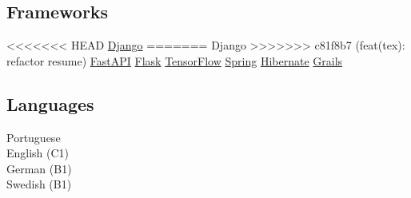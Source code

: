 \documentclass[]{willianpaixao-resume}
\begin{document}
\begin{minipage}[t]{0.34\textwidth}
\subsection{Frameworks}
<<<<<<< HEAD
\href{https://www.djangoproject.com/}{Django}\textbullet{}
=======
Django\textbullet{}
>>>>>>> c81f8b7 (feat(tex): refactor resume)
\href{https://fastapi.tiangolo.com/}{FastAPI}\textbullet{}
\href{https://flask.palletsprojects.com/}{Flask}\textbullet{}
\href{https://www.tensorflow.org/}{TensorFlow}
\href{https://spring.io/}{Spring}\textbullet{}
\href{https://hibernate.org/}{Hibernate}\textbullet{}
\href{https://grails.org/}{Grails}
\sectionsep

\subsection{Languages}
Portuguese\\
English (C1)\\
German (B1)\\
Swedish (B1)
\sectionsep


\end{minipage}
\hfill
\end{document}
